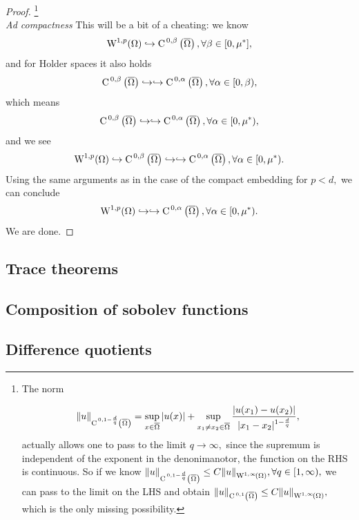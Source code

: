 \documentclass{article}
\begin{document}
\begin{proof}
    \footnote{The norm

	    \[
		    \norm{u}_{\text{C}^{\!\, \,0,1- \frac{d}{q}}\!\,\left(\overline{\Omega} \right)} = \sup_{x \in \overline{\Omega}}|u(x)| + \sup_{x_1 \neq x_2 \in \overline{\Omega}} \frac{|u(x_1) - u(x_2)|}{|x_1 - x_2|^{1- \frac{d}{q}}},
	    \]
    actually allows one to pass to the limit $q \to \infty,$ since the supremum is independent of the exponent in the denonimanotor, the function on the RHS is continuous. So if we know $\norm{u}_{\CklSet{0}{1-\frac{d}{q}}{\overline{\Omega}}}\leq C \norm{u}_{\WkpSet[1][\infty]{\Omega}}, \forall q \in [1, \infty),$ we can pass to the limit on the LHS and obtain $\norm{u}_{\CklSet{0}{1}{\overline{\Omega}}}\leq C \norm{u}_{\WkpSet[1][\infty]{\Omega}},$ which is the only missing possibility.}\\


    \textit{Ad compactness}
    This will be a bit of a cheating: we know
    \[
	    \WkpSet[1][p]{\Omega} \hookrightarrow \CklSet{0}{\beta}{\overline{\Omega}}, \forall \beta \in [0,\mu^{*}],
    \]
    and for Holder spaces it also holds
    \[
	    \text{C}^{\!\, \,0,\beta}\!\,\left(\overline{\Omega} \right) \hookrightarrow \hookrightarrow \text{C}^{\!\, \,0,\alpha}\!\,\left(\overline{\Omega} \right), \forall \alpha \in [0,\beta),
    \]
    which means
    \[
	    \text{C}^{\!\, \,0,\beta}\!\,\left(\overline{\Omega} \right) \hookrightarrow \hookrightarrow \text{C}^{\!\, \,0,\alpha}\!\,\left(\overline{\Omega} \right), \forall \alpha \in [0,\mu^{*}),
    \]
    and we see
    \[
	    \WkpSet[1][p]{\Omega} \hookrightarrow \CklSet{0}{\beta}{\overline{\Omega}} \hookrightarrow \hookrightarrow \CklSet{0}{\alpha}{\overline{\Omega}}, \forall \alpha \in [0, \mu^{*}).
    \]
    Using the same arguments as in the case of the compact embedding for $p <d, $ we can conclude
    \[
	    \WkpSet[1][p]{\Omega} \hookrightarrow \hookrightarrow \CklSet{0}{\alpha}{\overline{\Omega}}, \forall \alpha \in [0, \mu^{*}).
    \]
    We are done.



\end{proof}
\subsection{Trace theorems}
\label{sec:traces}

\subsection{Composition of sobolev functions}
\label{sec:composition}

\subsection{Difference quotients}
\label{sec:difference_quotients}
\end{document}
